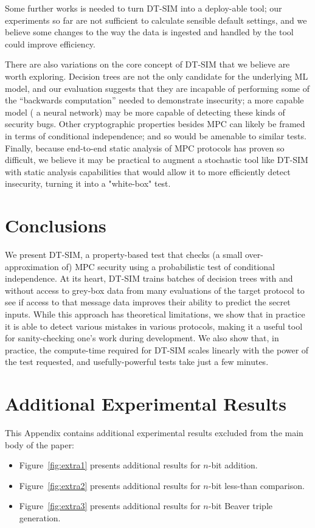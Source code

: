 \documentclass[compsoc, conference, a4paper, 10pt, times]{IEEEtran}
\newcommand{\toolname}{\textsc{DT-SIM}\xspace}
\begin{document}
Some further works is needed to turn \toolname into a deploy-able tool;
our experiments so far are not sufficient to calculate sensible default settings,
and we believe some changes to the way the data is ingested and handled by the tool could improve efficiency.

There are also variations on the core concept of \toolname that we believe are worth exploring.
Decision trees are not the only candidate for the underlying ML model, and our evaluation suggests that they are incapable of performing some of the ``backwards computation'' needed to demonstrate insecurity;
a more capable model (\eg{} a neural network) may be more capable of detecting these kinds of security bugs.
Other cryptographic properties besides MPC can likely be framed in terms of conditional independence;
and so would be amenable to similar tests.
Finally, because end-to-end static analysis of MPC protocols has proven so difficult,
we believe it may be practical to augment a stochastic tool like \toolname with static analysis capabilities
that would allow it to more efficiently detect insecurity, turning it into a "white-box" test.


\section{Conclusions}

We present \toolname,
a property-based test that checks (a small over-approximation of) MPC security
using a probabilistic test of conditional independence.
At its heart, \toolname trains batches of decision trees with and without access to grey-box data from many evaluations of the target protocol
to see if access to that message data improves their ability to predict the secret inputs.
While this approach has theoretical limitations, we show that in practice it is able to detect various mistakes in various protocols,
making it a useful tool for sanity-checking one's work during development.
We also show that, in practice, the compute-time required for \toolname scales linearly with the power of the test requested,
and usefully-powerful tests take just a few minutes.







\appendices

\section{Additional Experimental Results}
\label{sec:addit-exper-results}

This Appendix contains additional experimental results excluded from the main body of the paper:
%
\begin{itemize}
\item Figure~\ref{fig:extra1} presents additional results for $n$-bit addition.
\item Figure~\ref{fig:extra2} presents additional results for $n$-bit less-than comparison.
\item Figure~\ref{fig:extra3} presents additional results for $n$-bit Beaver triple generation.
\end{itemize}



\end{document}
